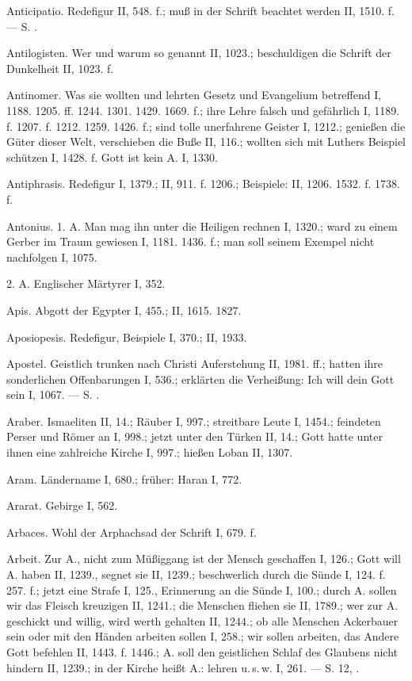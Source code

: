 Anticipatio. Redefigur II, 548. f.; muß in der Schrift beachtet werden II, 1510. f. — S. .

Antilogisten. Wer und warum so genannt II, 1023.; beschuldigen die Schrift der Dunkelheit II, 1023. f.

Antinomer. Was sie wollten und lehrten Gesetz und Evangelium betreffend I, 1188. 1205. ff. 1244. 1301. 1429. 1669. f.; ihre Lehre falsch und gefährlich I, 1189. f. 1207. f. 1212. 1259. 1426. f.; sind tolle unerfahrene Geister I, 1212.; genießen die Güter dieser Welt, verschieben die Buße II, 116.; wollten sich mit Luthers Beispiel schützen I, 1428. f. Gott ist kein A. I, 1330.

Antiphrasis. Redefigur I, 1379.; II, 911. f. 1206.; Beispiele: II, 1206. 1532. f. 1738. f.

Antonius. 1.  A. Man mag ihn unter die Heiligen rechnen I, 1320.; ward zu einem Gerber im Traum gewiesen I, 1181. 1436. f.; man soll seinem Exempel nicht nachfolgen I, 1075.

2.  A. Englischer Märtyrer I, 352.

Apis. Abgott der Egypter I, 455.; II, 1615. 1827.

Aposiopesis. Redefigur, Beispiele I, 370.; II, 1933.

Apostel. Geistlich trunken nach Christi Auferstehung II, 1981. ff.; hatten ihre sonderlichen Offenbarungen I, 536.; erklärten die Verheißung: Ich will dein Gott sein I, 1067. — S. .

Araber. Ismaeliten II, 14.; Räuber I, 997.; streitbare Leute I, 1454.; feindeten Perser und Römer an I, 998.; jetzt unter den Türken II, 14.; Gott hatte unter ihnen eine zahlreiche Kirche I, 997.; hießen Loban II, 1307.

Aram. Ländername I, 680.; früher: Haran I, 772.

Ararat. Gebirge I, 562.

Arbaces. Wohl der Arphachsad der Schrift I, 679. f.

Arbeit. Zur A., nicht zum Müßiggang ist der Mensch geschaffen I, 126.; Gott will A. haben II, 1239., segnet sie II, 1239.; beschwerlich durch die Sünde I, 124. f. 257. f.; jetzt eine Strafe I, 125., Erinnerung an die Sünde I, 100.; durch A. sollen wir das Fleisch kreuzigen II, 1241.; die Menschen fliehen sie II, 1789.; wer zur A. geschickt und willig, wird werth gehalten II, 1244.; ob alle Menschen Ackerbauer sein oder mit den Händen arbeiten sollen I, 258.; wir sollen arbeiten, das Andere Gott befehlen II, 1443. f. 1446.; A. soll den geistlichen Schlaf des Glaubens nicht hindern II, 1239.; in der Kirche heißt A.: lehren u.\,s.\,w. I, 261. — S.  12, .

